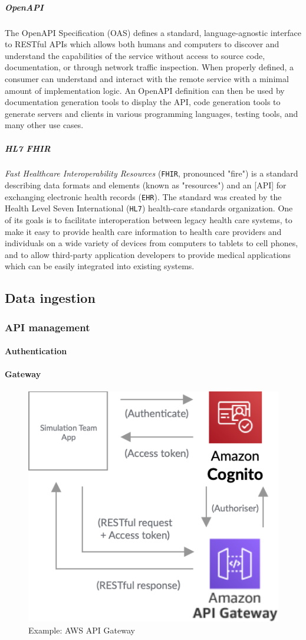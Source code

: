 \documentclass[10pt]{article}
\begin{document}
\subparagraph{OpenAPI}
The OpenAPI Specification (OAS) defines a standard, language-agnostic interface to RESTful APIs which allows both humans and computers to discover and understand the capabilities of the service without access to source code, documentation, or through network traffic inspection. When properly defined, a consumer can understand and interact with the remote service with a minimal amount of implementation logic. An OpenAPI definition can then be used by documentation generation tools to display the API, code generation tools to generate servers and clients in various programming languages, testing tools, and many other use cases. \cite{openapi}

\subparagraph{HL7 FHIR}
\textit{Fast Healthcare Interoperability Resources} (\texttt{FHIR}, pronounced "fire") is a standard describing data formats and elements (known as "resources") and an [API] for exchanging electronic health records (\texttt{EHR}). The standard was created by the Health Level Seven International (\texttt{HL7}) health-care standards organization. One of its goals is to facilitate interoperation between legacy health care systems, to make it easy to provide health care information to health care providers and individuals on a wide variety of devices from computers to tablets to cell phones, and to allow third-party application developers to provide medical applications which can be easily integrated into existing systems. \cite{fhir}

\subsection{Data ingestion}
\subsubsection{API management}
\paragraph{Authentication}
\paragraph{Gateway}

\begin{figure}[h!]
	\centering
	\includegraphics[width=0.4\linewidth]{images/APIGateway.png}	
	\caption*{Example: AWS API Gateway}
\end{figure}
\end{document}
